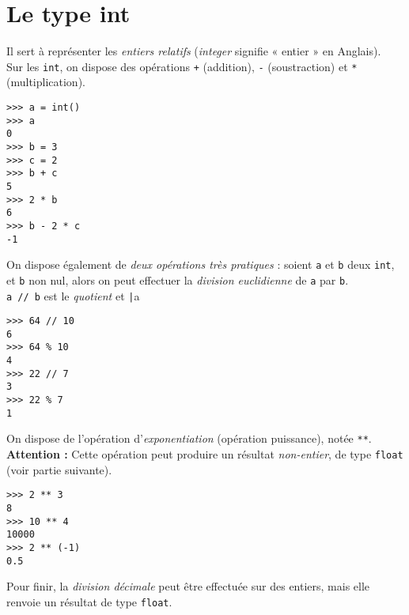 \section{Le type int}\label{sec:int}

Il sert à représenter les \textit{entiers relatifs} (\textit{integer} signifie « entier »  en Anglais).\\
Sur les \texttt{int}, on dispose des opérations \texttt{+} (addition), \texttt{-} (soustraction) et \texttt{*} (multiplication).

\begin{pyc}\begin{verbatim}
>>> a = int()
>>> a
0
>>> b = 3
>>> c = 2
>>> b + c
5
>>> 2 * b
6
>>> b - 2 * c
-1
\end{verbatim}
\end{pyc}

On dispose également de \textit{deux opérations très pratiques} : soient \texttt{a} et \texttt{b} deux \texttt{int}, et \texttt{b} non nul, alors on peut effectuer
la \textit{division euclidienne} de \texttt{a} par \texttt{b}.\\
\texttt{a // b} est le \textit{quotient} et \texttt|a %

\begin{pyc}\begin{verbatim}
>>> 64 // 10
6
>>> 64 % 10
4
>>> 22 // 7
3
>>> 22 % 7
1
\end{verbatim}
\end{pyc}



On dispose de l'opération d'\textit{exponentiation} (opération puissance), notée \texttt{**}.\\
\textbf{Attention :} Cette opération peut produire un résultat \textit{non-entier}, de type \texttt{float} (voir partie suivante).

\begin{pyc}\begin{verbatim}
>>> 2 ** 3
8
>>> 10 ** 4
10000
>>> 2 ** (-1)
0.5
\end{verbatim}
\end{pyc}

Pour finir, la \textit{division décimale} peut être effectuée sur des entiers, mais elle renvoie un résultat de type \texttt{float}.

